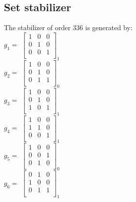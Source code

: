 \documentclass{article}
\begin{document}
{\subsection*{Set stabilizer}
The stabilizer of order $336$ is generated by:\\
$g_{1} = $ $\left[
\begin{array}{*{3}{r}}
1 & 0 & 0\\
0 & 1 & 0\\
0 & 0 & 1\\
\end{array}
\right]
_{1}
$\\
$g_{2} = $ $\left[
\begin{array}{*{3}{r}}
1 & 0 & 0\\
0 & 1 & 0\\
0 & 1 & 1\\
\end{array}
\right]
_{0}
$\\
$g_{3} = $ $\left[
\begin{array}{*{3}{r}}
1 & 0 & 0\\
0 & 1 & 0\\
1 & 0 & 1\\
\end{array}
\right]
_{1}
$\\
$g_{4} = $ $\left[
\begin{array}{*{3}{r}}
1 & 0 & 0\\
1 & 1 & 0\\
0 & 0 & 1\\
\end{array}
\right]
_{1}
$\\
$g_{5} = $ $\left[
\begin{array}{*{3}{r}}
1 & 0 & 0\\
0 & 0 & 1\\
0 & 1 & 0\\
\end{array}
\right]
_{0}
$\\
$g_{6} = $ $\left[
\begin{array}{*{3}{r}}
0 & 1 & 0\\
1 & 0 & 0\\
0 & 1 & 1\\
\end{array}
\right]
_{1}
$\\

}
\end{document}
